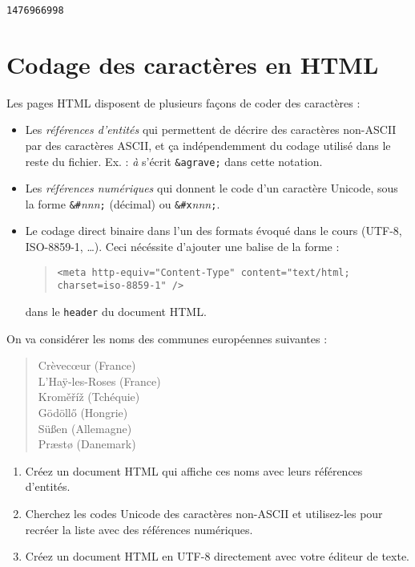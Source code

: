 \documentclass[11pt]{article}
\begin{document}
\begin{solution}
\begin{verbatim}
1476966998
\end{verbatim}
\end{solution}



\section{Codage des caractères en HTML}

Les pages HTML disposent de plusieurs façons de coder des caractères :\\
\begin{itemize}
\item Les \emph{références d'entités} qui permettent de décrire des
  caractères non-ASCII par des caractères ASCII, et ça indépendemment
  du codage utilisé dans le reste du fichier. Ex. : \emph{à} s'écrit
  \texttt{\&agrave;} dans cette notation.\smallskip
\item Les \emph{références numériques} qui donnent le code d'un
  caractère Unicode, sous la forme \texttt{\&\#}\emph{nnn}\texttt{;}
  (décimal) ou \texttt{\&\#x}\emph{nnn}\texttt{;}.\smallskip
\item Le codage direct binaire dans l'un des formats évoqué dans
  le cours (UTF-8, ISO-8859-1, \ldots). Ceci nécéssite d'ajouter une
  balise de la forme :
\begin{quote}
\texttt{<meta http-equiv="Content-Type" content="text/html; charset=iso-8859-1" />}
\end{quote}
  dans le \texttt{header} du document HTML.\\
\end{itemize}

On va considérer les noms des communes européennes suivantes :
\begin{quote}
Crèvec\oe{}ur (France)\\
L'Ha\"y-les-Roses (France)\\
Krom\v{e}\v{r}\'i\v{z} (Tchéquie)\\
G\"od\"oll\H{o} (Hongrie)\\
S\"u\ss{}en (Allemagne)\\
Pr\ae{}st\o{} (Danemark)
\end{quote}

\begin{enumerate}
 \item Créez un document HTML qui affiche ces noms avec leurs références d'entités.\smallskip
 \item Cherchez les codes Unicode des caractères non-ASCII et utilisez-les pour recréer la liste avec des références numériques.\smallskip
 \item Créez un document HTML en UTF-8 directement avec votre éditeur de texte.
\end{enumerate}
\end{document}
